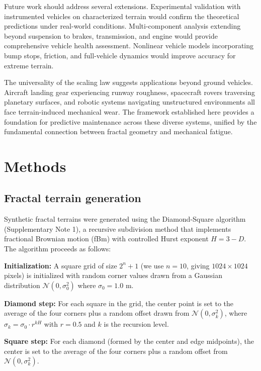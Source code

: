\documentclass[11pt,letterpaper]{article}
\begin{document}
Future work should address several extensions. Experimental validation with instrumented vehicles on characterized terrain would confirm the theoretical predictions under real-world conditions. Multi-component analysis extending beyond suspension to brakes, transmission, and engine would provide comprehensive vehicle health assessment. Nonlinear vehicle models incorporating bump stops, friction, and full-vehicle dynamics would improve accuracy for extreme terrain.

The universality of the scaling law suggests applications beyond ground vehicles. Aircraft landing gear experiencing runway roughness, spacecraft rovers traversing planetary surfaces, and robotic systems navigating unstructured environments all face terrain-induced mechanical wear. The framework established here provides a foundation for predictive maintenance across these diverse systems, unified by the fundamental connection between fractal geometry and mechanical fatigue.

\section{Methods}

\subsection{Fractal terrain generation}

Synthetic fractal terrains were generated using the Diamond-Square algorithm\cite{Voss1985} (Supplementary Note 1), a recursive subdivision method that implements fractional Brownian motion (fBm) with controlled Hurst exponent $H = 3-D$. The algorithm proceeds as follows:

\textbf{Initialization:} A square grid of size $2^n + 1$ (we use $n = 10$, giving $1024 \times 1024$ pixels) is initialized with random corner values drawn from a Gaussian distribution $\mathcal{N}(0, \sigma_0^2)$ where $\sigma_0 = 1.0$ m.

\textbf{Diamond step:} For each square in the grid, the center point is set to the average of the four corners plus a random offset drawn from $\mathcal{N}(0, \sigma_k^2)$, where $\sigma_k = \sigma_0 \cdot r^{kH}$ with $r = 0.5$ and $k$ is the recursion level.

\textbf{Square step:} For each diamond (formed by the center and edge midpoints), the center is set to the average of the four corners plus a random offset from $\mathcal{N}(0, \sigma_k^2)$.
\end{document}
